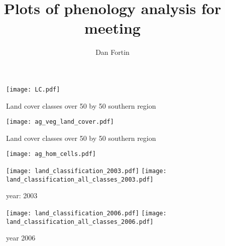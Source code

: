 \documentclass[11pt, oneside]{article}   	%
\title{Plots of phenology analysis for meeting }
\author{Dan Fortin}
\begin{document}
\maketitle

\begin{figure}[htbp] %
   \centering
   \texttt{[image: LC.pdf]} 
   \caption{Land cover classes over 50 by 50 southern region}
   \label{fig:example}
\end{figure}

\begin{figure}[htbp] %
   \centering
   \texttt{[image: ag\_veg\_land\_cover.pdf]} 
   \caption{Land cover classes over 50 by 50 southern region}
   \label{fig:example}
\end{figure}


\begin{figure}[htbp] %
   \centering
   \texttt{[image: ag\_hom\_cells.pdf]}
   \caption{}
   \label{fig:example}
\end{figure}


\begin{figure}[htbp] %
   \centering
   \texttt{[image: land\_classification\_2003.pdf]} 
	 \texttt{[image: land\_classification\_all\_classes\_2003.pdf]} 
   \caption{year: 2003}
   \label{fig:example}
\end{figure}


\begin{figure}[htbp] %
   \centering
   \texttt{[image: land\_classification\_2006.pdf]} 
	 \texttt{[image: land\_classification\_all\_classes\_2006.pdf]} 
   \caption{year 2006}
   \label{fig:example}
\end{figure}
\end{document}
